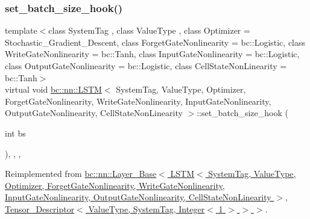 \subsubsection{\texorpdfstring{set\+\_\+batch\+\_\+size\+\_\+hook()}{set\_batch\_size\_hook()}}
{\footnotesize\ttfamily template$<$class System\+Tag , class Value\+Type , class Optimizer  = Stochastic\+\_\+\+Gradient\+\_\+\+Descent, class Forget\+Gate\+Nonlinearity  = bc\+::\+Logistic, class Write\+Gate\+Nonlinearity  = bc\+::\+Tanh, class Input\+Gate\+Nonlinearity  = bc\+::\+Logistic, class Output\+Gate\+Nonlinearity  = bc\+::\+Logistic, class Cell\+State\+Non\+Linearity  = bc\+::\+Tanh$>$ \\
virtual void \hyperlink{structbc_1_1nn_1_1LSTM}{bc\+::nn\+::\+L\+S\+TM}$<$ System\+Tag, Value\+Type, Optimizer, Forget\+Gate\+Nonlinearity, Write\+Gate\+Nonlinearity, Input\+Gate\+Nonlinearity, Output\+Gate\+Nonlinearity, Cell\+State\+Non\+Linearity $>$\+::set\+\_\+batch\+\_\+size\+\_\+hook (\begin{DoxyParamCaption}\item[{int}]{bs }\end{DoxyParamCaption})\hspace{0.3cm}{\ttfamily [inline]}, {\ttfamily [final]}, {\ttfamily [override]}, {\ttfamily [virtual]}}



Reimplemented from \hyperlink{structbc_1_1nn_1_1Layer__Base_a8365fc3fc656aadeb0513d8e02b5fba0}{bc\+::nn\+::\+Layer\+\_\+\+Base$<$ L\+S\+T\+M$<$ System\+Tag, Value\+Type, Optimizer, Forget\+Gate\+Nonlinearity, Write\+Gate\+Nonlinearity, Input\+Gate\+Nonlinearity, Output\+Gate\+Nonlinearity, Cell\+State\+Non\+Linearity $>$, Tensor\+\_\+\+Descriptor$<$ Value\+Type, System\+Tag, Integer$<$ 1 $>$ $>$ $>$}.

\mbox{\label{structbc_1_1nn_1_1LSTM_a772315b1deeaa862a59437d4a1ccf9a8}} 

